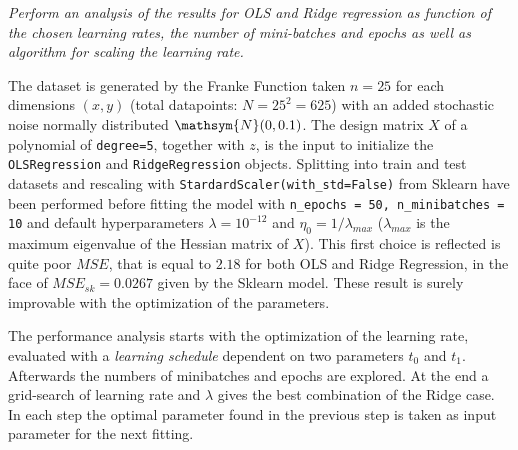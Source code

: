 \documentclass[english,notitlepage,reprint,nofootinbib]{revtex4-1}  %
\begin{document}
\textit{Perform an analysis of the results for OLS and Ridge regression as
function of the chosen learning rates, the number of mini-batches and
epochs as well as algorithm for scaling the learning rate.}

The dataset is generated by the Franke Function taken $n=25$ for each dimensions $(x,y)$ (total datapoints: $N=25^2=625$) with an added stochastic noise normally distributed $\mathsym{N}(0,0.1)$. The design matrix $X$ of a polynomial of \texttt{degree=5}, together with $z$, is the input to initialize the \texttt{OLSRegression} and \texttt{RidgeRegression} objects. Splitting into train and test datasets and rescaling with \texttt{StardardScaler(with\_std=False)} from Sklearn have been performed before fitting the model with \texttt{n\_epochs = 50, n\_minibatches = 10} and default hyperparameters $\lambda = 10^{-12}$ and $\eta_0 = 1 / \lambda_{max}$ ($\lambda_{max}$ is the maximum eigenvalue of the Hessian matrix of $X$). This first choice is reflected is quite poor $MSE$, that is equal to $2.18$ for both OLS and Ridge Regression, in the face of $MSE_{sk} = 0.0267$ given by the Sklearn model. These result is surely improvable with the optimization of the parameters.

The performance analysis starts with the optimization of the learning rate, evaluated with a \textit{learning schedule} dependent on two parameters $t_0$ and $t_1$. Afterwards the numbers of minibatches and epochs are explored. At the end a grid-search of learning rate and $\lambda$ gives the best combination of the Ridge case. In each step the optimal parameter found in the previous step is taken as input parameter for the next fitting.
\end{document}
